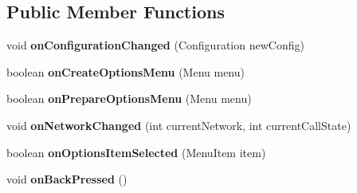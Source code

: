 \subsection*{Public Member Functions}
\begin{DoxyCompactItemize}
\item 
\hypertarget{classcom_1_1qualoutdoor_1_1recorder_1_1MainActivity_a05cb2528ea012100ef910ab8f594f2cf}{void {\bfseries on\-Configuration\-Changed} (Configuration new\-Config)}\label{classcom_1_1qualoutdoor_1_1recorder_1_1MainActivity_a05cb2528ea012100ef910ab8f594f2cf}

\item 
\hypertarget{classcom_1_1qualoutdoor_1_1recorder_1_1MainActivity_a07e8ec713e5d04718cf87497a7cb3dd4}{boolean {\bfseries on\-Create\-Options\-Menu} (Menu menu)}\label{classcom_1_1qualoutdoor_1_1recorder_1_1MainActivity_a07e8ec713e5d04718cf87497a7cb3dd4}

\item 
\hypertarget{classcom_1_1qualoutdoor_1_1recorder_1_1MainActivity_a03f3d576991fe48076517803a1608e42}{boolean {\bfseries on\-Prepare\-Options\-Menu} (Menu menu)}\label{classcom_1_1qualoutdoor_1_1recorder_1_1MainActivity_a03f3d576991fe48076517803a1608e42}

\item 
\hypertarget{classcom_1_1qualoutdoor_1_1recorder_1_1MainActivity_ab00ad5adc5560911e0147f3cb3cdbd50}{void {\bfseries on\-Network\-Changed} (int current\-Network, int current\-Call\-State)}\label{classcom_1_1qualoutdoor_1_1recorder_1_1MainActivity_ab00ad5adc5560911e0147f3cb3cdbd50}

\item 
\hypertarget{classcom_1_1qualoutdoor_1_1recorder_1_1MainActivity_a0788a0a3c8c1fbc9e410b94483b858b3}{boolean {\bfseries on\-Options\-Item\-Selected} (Menu\-Item item)}\label{classcom_1_1qualoutdoor_1_1recorder_1_1MainActivity_a0788a0a3c8c1fbc9e410b94483b858b3}

\item 
\hypertarget{classcom_1_1qualoutdoor_1_1recorder_1_1MainActivity_a7ab297972634760af9706e6dc8a31c92}{void {\bfseries on\-Back\-Pressed} ()}\label{classcom_1_1qualoutdoor_1_1recorder_1_1MainActivity_a7ab297972634760af9706e6dc8a31c92}

\end{DoxyCompactItemize}
